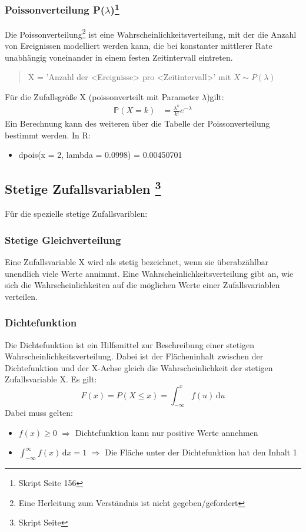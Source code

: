 \documentclass[a4paper,10pt]{scrartcl}
\begin{document}
\subsubsection[Poissonverteilung]{Poissonverteilung P($\lambda$)\footnote{Skript Seite 156}}
Die Poissonverteilung\footnote{Eine Herleitung zum Verständnis ist nicht gegeben/gefordert } ist eine Wahrscheinlichkeitsverteilung, mit der die Anzahl von Ereignissen modelliert werden kann, die bei konstanter mittlerer Rate unabhängig voneinander in einem festen Zeitintervall eintreten.
\begin{quote}
    X = 'Anzahl der <Ereignisse> pro <Zeitintervall>' mit $X \sim P(\lambda)$
\end{quote}
Für die Zufallsgröße X (poissonverteilt mit Parameter $\lambda$)gilt:
\begin{align*}
\mathbb{P}(X=k)&=\frac{\lambda^k}{k!}e^{-\lambda}
\end{align*}
Ein Berechnung kann des weiteren über die Tabelle der Poissonverteilung bestimmt werden.
In R:
\begin{itemize}
    \item dpois(x = 2, lambda = 0.0998) = 0.00450701
\end{itemize}
\subsection[Stetige Zufallsvariablen]{Stetige Zufallsvariablen \footnote{Skript Seite}}
Für die spezielle stetige Zufallsvariblen:
\subsubsection{Stetige Gleichverteilung}
Eine Zufallsvariable X wird als stetig bezeichnet, wenn sie überabzählbar unendlich viele Werte annimmt. Eine Wahrscheinlichkeitsverteilung gibt an, wie sich die Wahrscheinlichkeiten auf die möglichen Werte einer Zufallsvariablen verteilen.
\subsubsection{Dichtefunktion}
Die Dichtefunktion ist ein Hilfsmittel zur Beschreibung einer stetigen Wahrscheinlichkeitsverteilung. Dabei ist der Flächeninhalt zwischen der Dichtefunktion und der X-Achse gleich die Wahrscheinlichkeit der stetigen Zufallsvariable X.
Es gilt:
\begin{equation*}
F(x) = P(X \le x) = \int_{-\infty}^{x} \! f(u) \, \mathrm{d}u    
\end{equation*}
Dabei muss gelten:
\begin{itemize}
    \item $f(x) \geq 0$ $\Rightarrow$ Dichtefunktion kann nur positive Werte annehmen 
    \item $\int_{-\infty}^{\infty} \! f(x) \, \mathrm{d}x = 1$ $\Rightarrow$ Die Fläche unter der Dichtefunktion hat den Inhalt 1
\end{itemize}
\end{document}
